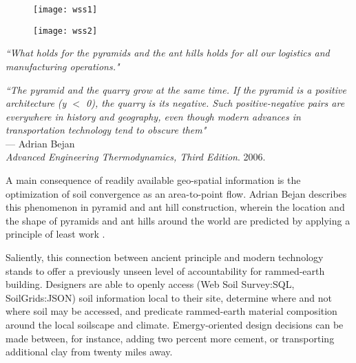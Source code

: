 \begin{figure}[H]
  \texttt{[image: wss1]}

  \texttt{[image: wss2]}
\end{figure}






\begin{flushright}
\small{
\textit{``What holds for the pyramids and the ant hills holds for all our logistics and manufacturing operations."}}
\end{flushright}

\vspace{5mm}

\begin{flushright}
\small{
\textit{``The pyramid and the quarry grow at the same time. If the pyramid is a positive architecture (y $<$ 0), the quarry is its negative. Such positive-negative pairs are everywhere in history and geography, even though modern advances in transportation technology tend to obscure them" }}\\ --- Adrian Bejan \\ \textit{Advanced Engineering Thermodynamics, Third Edition}. 2006.
\end{flushright}

A main consequence of readily available geo-spatial information is the optimization of soil convergence as an area-to-point flow. Adrian Bejan describes this phenomenon in pyramid and ant hill construction, wherein the location and the shape of pyramids and ant hills around the world are predicted by applying a principle of least work \cite{FLOWFOSSIL}.

Saliently, this connection between ancient principle and modern technology stands to offer a previously unseen level of accountability for rammed-earth building. Designers are able to openly access (Web Soil Survey:SQL, SoilGrids:JSON) soil information local to their site, determine where and not where soil may be accessed, and predicate rammed-earth material composition around the local soilscape and climate. Emergy-oriented design decisions can be made between, for instance, adding two percent more cement, or transporting additional clay from twenty miles away.
